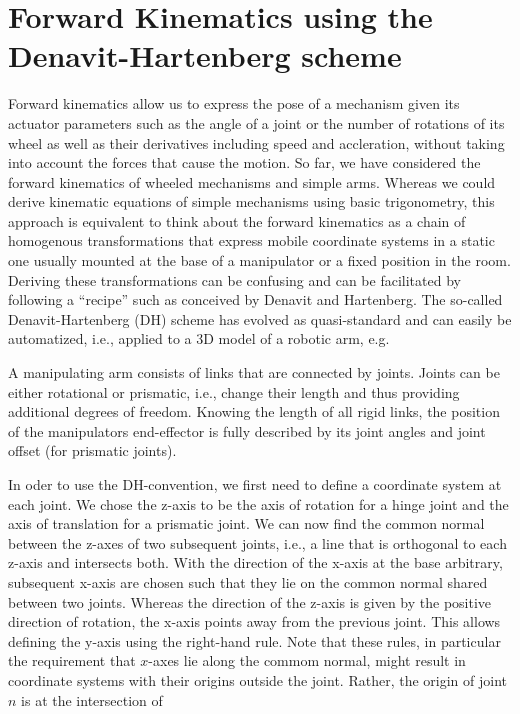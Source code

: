 \section{Forward Kinematics using the Denavit-Hartenberg scheme}
 Forward kinematics allow us to express the pose of a mechanism given its actuator parameters such as the angle of a joint or the number of rotations of its wheel as well as their derivatives including speed and accleration, without taking into account the forces that cause the motion. So far, we have considered the forward kinematics of wheeled mechanisms and simple arms. Whereas we could derive kinematic equations of simple mechanisms using basic trigonometry, this approach is equivalent to think about the forward kinematics as a chain of homogenous transformations that express mobile coordinate systems in a static one usually mounted at the base of a manipulator or a fixed position in the room. Deriving these transformations can be confusing and can be facilitated by following a ``recipe'' such as conceived by Denavit and Hartenberg. The so-called Denavit-Hartenberg (DH) scheme has evolved as quasi-standard and can easily be automatized, i.e., applied to a 3D model of a robotic arm, e.g. 

A manipulating arm consists of links that are connected by joints. Joints can be either rotational or prismatic, i.e., change their length and thus providing additional degrees of freedom. Knowing the length of all rigid links, the position of the manipulators end-effector is fully described by its joint angles and joint offset (for prismatic joints).


In oder to use the DH-convention, we first need to define a coordinate system at each joint. We chose the z-axis to be the axis of rotation for a hinge joint and the axis of translation for a prismatic joint. We can now find the common normal between the z-axes of two subsequent joints, i.e., a line that is orthogonal to each z-axis and intersects both. With the direction of the x-axis at the base arbitrary, subsequent x-axis are chosen such that they lie on the common normal shared between two joints. Whereas the direction of the z-axis is given by the positive direction of rotation, the x-axis points away from the previous joint. This allows defining the y-axis using the right-hand rule. Note that these rules, in particular the requirement that $x$-axes lie along the commom normal, might result in coordinate systems with their origins outside the joint. Rather, the origin of joint $n$ is at the intersection of   

